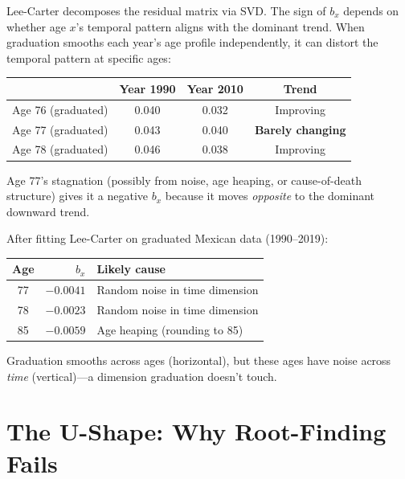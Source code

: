 \documentclass[11pt, a4paper]{article}
\newcommand{\bx}{b_x}
\begin{document}
\begin{formaldef}[Why Negative $\bx$ Appears]
Lee-Carter decomposes the residual matrix via SVD. The sign of $\bx$
depends on whether age $x$'s temporal pattern aligns with the dominant
trend. When graduation smooths each year's age profile independently,
it can distort the temporal pattern at specific ages:

\medskip
\begin{center}
\begin{tabular}{lccc}
\toprule
& Year 1990 & Year 2010 & \textbf{Trend} \\
\midrule
Age 76 (graduated) & 0.040 & 0.032 & Improving \\
Age 77 (graduated) & 0.043 & 0.040 & \textbf{Barely changing} \\
Age 78 (graduated) & 0.046 & 0.038 & Improving \\
\bottomrule
\end{tabular}
\end{center}

\medskip
Age 77's stagnation (possibly from noise, age heaping, or cause-of-death
structure) gives it a negative $\bx$ because it moves \emph{opposite}
to the dominant downward trend.
\end{formaldef}

\begin{application}
After fitting Lee-Carter on graduated Mexican data (1990--2019):

\begin{center}
\begin{tabular}{crl}
\toprule
\textbf{Age} & $\bx$ & \textbf{Likely cause} \\
\midrule
77 & $-0.0041$ & Random noise in time dimension \\
78 & $-0.0023$ & Random noise in time dimension \\
85 & $-0.0059$ & Age heaping (rounding to 85) \\
\bottomrule
\end{tabular}
\end{center}

Graduation smooths across ages (horizontal), but these ages have noise
across \emph{time} (vertical)---a dimension graduation doesn't touch.
\end{application}


\section{The U-Shape: Why Root-Finding Fails}
\end{document}
